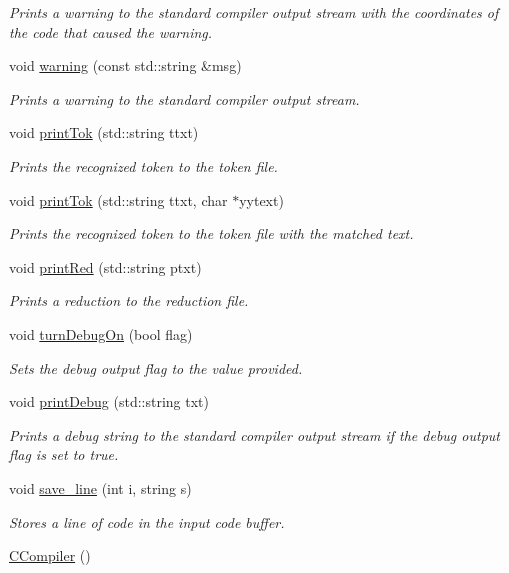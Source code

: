 \begin{DoxyCompactItemize}
\begin{DoxyCompactList}\small\item\em Prints a warning to the standard compiler output stream with the coordinates of the code that caused the warning. \end{DoxyCompactList}\item 
void \hyperlink{classCCompiler_a763a49b094c39f1105cb41be54b3cb13}{warning} (const std\-::string \&msg)
\begin{DoxyCompactList}\small\item\em Prints a warning to the standard compiler output stream. \end{DoxyCompactList}\item 
void \hyperlink{classCCompiler_a9b22e2e590320adbb31fcd74981e1bf5}{print\-Tok} (std\-::string ttxt)
\begin{DoxyCompactList}\small\item\em Prints the recognized token to the token file. \end{DoxyCompactList}\item 
void \hyperlink{classCCompiler_a14c4d23d93ef5efb73d7d6dba3e9689e}{print\-Tok} (std\-::string ttxt, char $\ast$yytext)
\begin{DoxyCompactList}\small\item\em Prints the recognized token to the token file with the matched text. \end{DoxyCompactList}\item 
void \hyperlink{classCCompiler_a8067a904454b386b22f4a76c2fa153b7}{print\-Red} (std\-::string ptxt)
\begin{DoxyCompactList}\small\item\em Prints a reduction to the reduction file. \end{DoxyCompactList}\item 
void \hyperlink{classCCompiler_a8098c8e8071444110d5a517d7fa172a8}{turn\-Debug\-On} (bool flag)
\begin{DoxyCompactList}\small\item\em Sets the debug output flag to the value provided. \end{DoxyCompactList}\item 
void \hyperlink{classCCompiler_ad05b354c2c416543d9238c9d8203a0f2}{print\-Debug} (std\-::string txt)
\begin{DoxyCompactList}\small\item\em Prints a debug string to the standard compiler output stream if the debug output flag is set to true. \end{DoxyCompactList}\item 
void \hyperlink{classCCompiler_a29d69476eff6dba6b2697b065b7fbc6b}{save\-\_\-line} (int i, string s)
\begin{DoxyCompactList}\small\item\em Stores a line of code in the input code buffer. \end{DoxyCompactList}\item 
\hypertarget{classCCompiler_aa2bf25daa08b040296dab6f21b5b514b}{\hyperlink{classCCompiler_aa2bf25daa08b040296dab6f21b5b514b}{C\-Compiler} ()}\label{classCCompiler_aa2bf25daa08b040296dab6f21b5b514b}


\end{DoxyCompactItemize}
